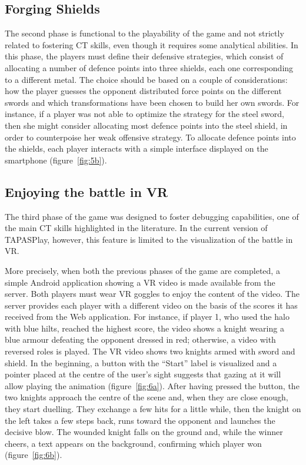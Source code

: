 \subsection{Forging Shields}
The second phase is functional to the playability of the game and not strictly related to fostering \ac{CT} skills, even though it requires some analytical abilities. In this phase, the players must define their defensive strategies, which consist of allocating a number of defence points into three shields, each one corresponding to a different metal. The choice should be based on a couple of considerations: how the player guesses the opponent distributed force points on the different swords and which transformations have been chosen to build her own swords. For instance, if a player was not able to optimize the strategy for the steel sword, then she might consider allocating most defence points into the steel shield, in order to counterpoise her weak offensive strategy. To allocate defence points into the shields, each player interacts with a simple interface displayed on the smartphone (figure~\ref{fig:5b}).

\subsection{Enjoying the battle in VR}
The third phase of the game was designed to foster debugging capabilities, one of the main \ac{CT} skills highlighted in the literature. In the current version of TAPASPlay, however, this feature is limited to the visualization of the battle in \ac{VR}.

More precisely, when both the previous phases of the game are completed, a simple Android application showing a \ac{VR} video is made available from the server. Both players must wear VR goggles to enjoy the content of the video. The server provides each player with a different video on the basis of the scores it has received from the Web application. For instance, if player 1, who used the halo with blue hilts, reached the highest score, the video shows a knight wearing a blue armour defeating the opponent dressed in red; otherwise, a video with reversed roles is played. The \ac{VR} video shows two knights armed with sword and shield. In the beginning, a button with the ``Start'' label is visualized and a pointer placed at the centre of the user's sight suggests that gazing at it will allow playing the animation (figure~\ref{fig:6a}). After having pressed the button, the two knights approach the centre of the scene and, when they are close enough, they start duelling. They exchange a few hits for a little while, then the knight on the left takes a few steps back, runs toward the opponent and launches the decisive blow. The wounded knight falls on the ground and, while the winner cheers, a text appears on the background, confirming which player won (figure~\ref{fig:6b}).


